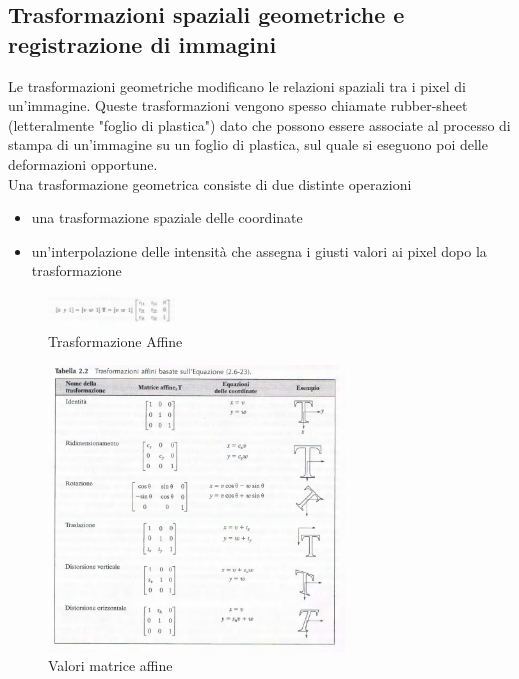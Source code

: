 \documentclass[12pt]{article}
\begin{document}
\subsection{Trasformazioni spaziali geometriche e registrazione di immagini}
Le trasformazioni geometriche modificano le relazioni spaziali tra i pixel di un'immagine. Queste trasformazioni vengono spesso chiamate rubber-sheet (letteralmente "foglio di plastica") dato che possono essere associate al processo di stampa di un'immagine su un foglio di plastica, sul quale si eseguono poi delle deformazioni opportune.\\
Una trasformazione geometrica consiste di due distinte operazioni
\begin{itemize}
    \item una trasformazione spaziale delle coordinate
    \item un'interpolazione delle intensità che assegna i giusti valori ai pixel dopo la trasformazione
\end{itemize}
\begin{figure}[!htb]
    \centering
    \includegraphics[width=0.3\textwidth]{Images/trasfaff.png}
    \caption{Trasformazione Affine}
\end{figure}
\FloatBarrier
\begin{figure}[!htb]
    \centering
    \includegraphics[width=0.7\textwidth]{Images/affini.png}
    \caption{Valori matrice affine}
\end{figure}
\FloatBarrier
\end{document}
